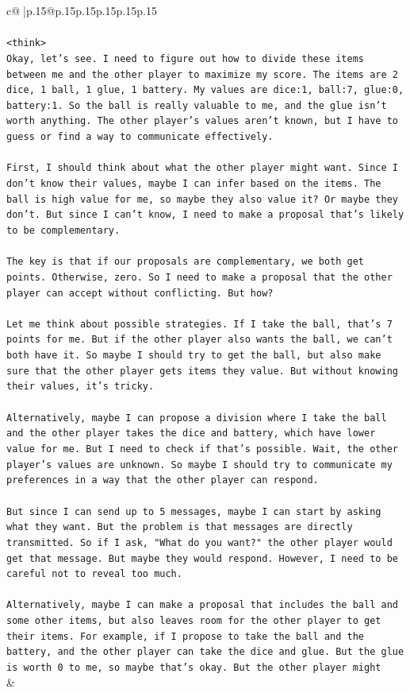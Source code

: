 \documentclass{article}
\begin{document}
{\begin{supertabular}{c@{$\;$}|p{.15\linewidth}@{}p{.15\linewidth}p{.15\linewidth}p{.15\linewidth}p{.15\linewidth}p{.15\linewidth}}
{{{\\ 
\\ 
\texttt{<think>} \\
\texttt{Okay, let's see. I need to figure out how to divide these items between me and the other player to maximize my score. The items are 2 dice, 1 ball, 1 glue, 1 battery. My values are dice:1, ball:7, glue:0, battery:1. So the ball is really valuable to me, and the glue isn't worth anything. The other player's values aren't known, but I have to guess or find a way to communicate effectively.} \\
\\ 
\texttt{First, I should think about what the other player might want. Since I don't know their values, maybe I can infer based on the items. The ball is high value for me, so maybe they also value it? Or maybe they don't. But since I can't know, I need to make a proposal that's likely to be complementary.} \\
\\ 
\texttt{The key is that if our proposals are complementary, we both get points. Otherwise, zero. So I need to make a proposal that the other player can accept without conflicting. But how?} \\
\\ 
\texttt{Let me think about possible strategies. If I take the ball, that's 7 points for me. But if the other player also wants the ball, we can't both have it. So maybe I should try to get the ball, but also make sure that the other player gets items they value. But without knowing their values, it's tricky.} \\
\\ 
\texttt{Alternatively, maybe I can propose a division where I take the ball and the other player takes the dice and battery, which have lower value for me. But I need to check if that's possible. Wait, the other player's values are unknown. So maybe I should try to communicate my preferences in a way that the other player can respond.} \\
\\ 
\texttt{But since I can send up to 5 messages, maybe I can start by asking what they want. But the problem is that messages are directly transmitted. So if I ask, "What do you want?" the other player would get that message. But maybe they would respond. However, I need to be careful not to reveal too much.} \\
\\ 
\texttt{Alternatively, maybe I can make a proposal that includes the ball and some other items, but also leaves room for the other player to get their items. For example, if I propose to take the ball and the battery, and the other player can take the dice and glue. But the glue is worth 0 to me, so maybe that's okay. But the other player might} \\
            }
        }
    }
    & \\ \\


\end{supertabular}}
\end{document}
